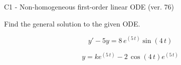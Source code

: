 \begin{exercise}
  \begin{exerciseTitle}C1 - Non-homogeneous first-order linear ODE (ver. 76)\end{exerciseTitle}
  \begin{exerciseStatement}
    
Find the general solution to the given ODE.

    
\[y'-5y= 8 \, e^{\left(5 \, t\right)} \sin\left(4 \, t\right)\]

  \end{exerciseStatement}
  \begin{exerciseAnswer}
    
\[y= k e^{\left(5 \, t\right)} - 2 \, \cos\left(4 \, t\right) e^{\left(5 \, t\right)}\]

  \end{exerciseAnswer}
\end{exercise}